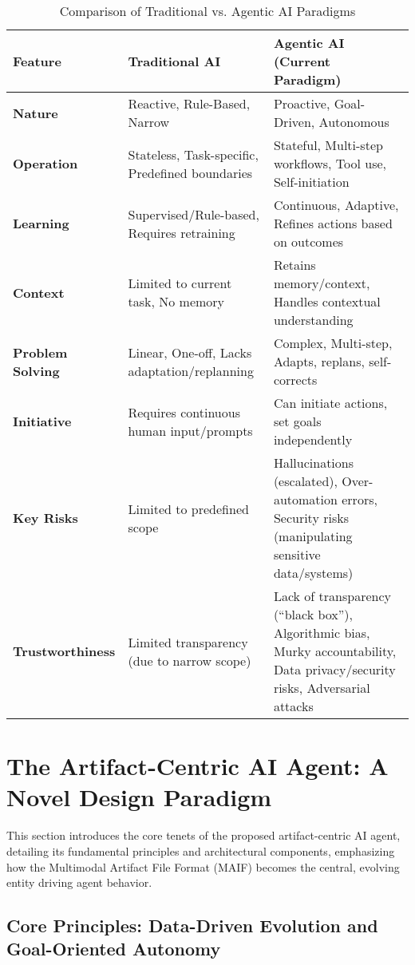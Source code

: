 \documentclass[conference]{IEEEtran}
\begin{document}
\begin{table*}[!t]
\renewcommand{\arraystretch}{1.3}
\caption{Comparison of Traditional vs. Agentic AI Paradigms}
\label{tab:comparison}
\centering
\footnotesize
\begin{tabular}{p{3.5cm}p{6cm}p{6cm}}
\toprule
\textbf{Feature} & \textbf{Traditional AI} & \textbf{Agentic AI (Current Paradigm)} \\
\midrule
\textbf{Nature} & Reactive, Rule-Based, Narrow & Proactive, Goal-Driven, Autonomous \\
\textbf{Operation} & Stateless, Task-specific, Predefined boundaries & Stateful, Multi-step workflows, Tool use, Self-initiation \\
\textbf{Learning} & Supervised/Rule-based, Requires retraining & Continuous, Adaptive, Refines actions based on outcomes \\
\textbf{Context} & Limited to current task, No memory & Retains memory/context, Handles contextual understanding \\
\textbf{Problem Solving} & Linear, One-off, Lacks adaptation/replanning & Complex, Multi-step, Adapts, replans, self-corrects \\
\textbf{Initiative} & Requires continuous human input/prompts & Can initiate actions, set goals independently \\
\textbf{Key Risks} & Limited to predefined scope & Hallucinations (escalated), Over-automation errors, Security risks (manipulating sensitive data/systems) \\
\textbf{Trustworthiness} & Limited transparency (due to narrow scope) & Lack of transparency (``black box''), Algorithmic bias, Murky accountability, Data privacy/security risks, Adversarial attacks \\
\bottomrule
\end{tabular}
\end{table*}

\section{The Artifact-Centric AI Agent: A Novel Design Paradigm}
\label{sec:artifact-centric}

This section introduces the core tenets of the proposed artifact-centric AI agent, detailing its fundamental principles and architectural components, emphasizing how the Multimodal Artifact File Format (MAIF) becomes the central, evolving entity driving agent behavior.

\subsection{Core Principles: Data-Driven Evolution and Goal-Oriented Autonomy}
\end{document}
